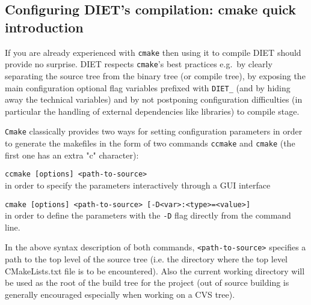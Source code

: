 \subsection{Configuring DIET's compilation: cmake quick introduction}
If you are already experienced with \verb+cmake+ then using it to compile
DIET should provide no surprise. 
DIET respects \verb+cmake+'s best practices e.g.~by clearly separating the
source tree from the binary tree (or compile tree), by exposing the main
configuration optional flag variables prefixed with \verb+DIET_+ (and by
hiding away the technical variables) and by not postponing configuration
difficulties (in particular the handling of external dependencies like
libraries) to compile stage.

\verb+Cmake+ classically provides two ways for setting configuration
parameters in order to generate the makefiles in the form of two
commands \verb+ccmake+ and \verb+cmake+ (the first one has an extra "c"
character):
\begin{description}
\item{\verb+ccmake [options] <path-to-source>+}\\
  in order to specify the parameters interactively through a GUI interface
\item{\verb+cmake [options] <path-to-source> [-D<var>:<type>=<value>]+}\\
  in order to define the parameters with the \verb+-D+ flag directly
  from the command line.
\end{description}
In the above syntax description of both commands, {\verb+<path-to-source>+}
specifies a path to the top level of the source tree (i.e. the directory
where the top level CMakeLists.txt file is to be encountered). Also
the current working directory will be used as the root of the build tree for
the project (out of source building is generally encouraged especially
when working on a CVS tree).

